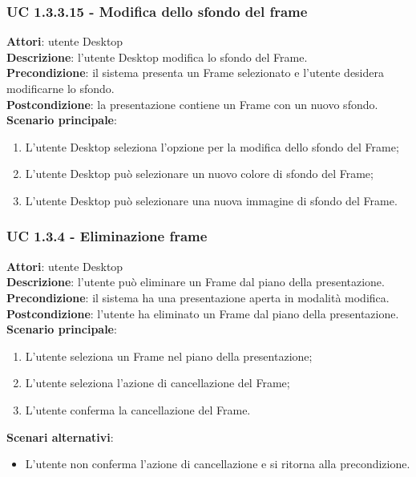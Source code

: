 \subsubsection{UC 1.3.3.15 - Modifica dello sfondo del frame}{
	\label{uc1.3.3.15}
	\textbf{Attori}: utente Desktop \\
	\textbf{Descrizione}: l'utente Desktop modifica lo sfondo del Frame. \\
	\textbf{Precondizione}: il sistema presenta un Frame selezionato e l'utente desidera modificarne lo sfondo.	\\
	\textbf{Postcondizione}: la presentazione contiene un Frame con un nuovo sfondo.	\\
	\textbf{Scenario principale}:
	\begin{enumerate}
		\item L'utente Desktop seleziona l'opzione per la modifica dello sfondo del Frame;
		\item L'utente Desktop può selezionare un nuovo colore di sfondo del Frame;
		\item L'utente Desktop può selezionare una nuova immagine di sfondo del Frame.
	\end{enumerate}
	}
\subsubsection{UC 1.3.4 - Eliminazione frame}{
	\label{uc1.3.4}
	\textbf{Attori}: utente Desktop \\
	\textbf{Descrizione}: l'utente può eliminare un Frame dal piano della presentazione. \\
	\textbf{Precondizione}: il sistema ha una presentazione aperta in modalità modifica.	\\
	\textbf{Postcondizione}: l'utente ha eliminato un Frame dal piano della presentazione.	\\
	\textbf{Scenario principale}:
	\begin{enumerate}
		\item L'utente seleziona un Frame nel piano della presentazione;
		\item L'utente seleziona l'azione di cancellazione del Frame;
		\item L'utente conferma la cancellazione del Frame.
	\end{enumerate}
	\textbf{Scenari alternativi}: 
	\begin{itemize}
		\item L'utente non conferma l'azione di cancellazione e si ritorna alla precondizione.
	\end{itemize}
}
